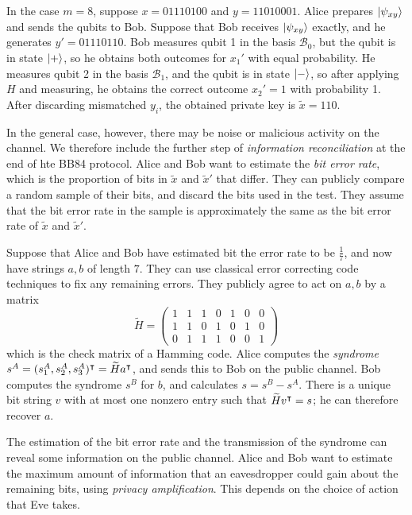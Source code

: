 In the case \( m = 8 \), suppose \( x = 01110100 \) and \( y = 11010001 \).
Alice prepares \( \ket{\psi_{xy}} \) and sends the qubits to Bob.
Suppose that Bob receives \( \ket{\psi_{xy}} \) exactly, and he generates \( y' = 01110110 \).
Bob measures qubit 1 in the basis \( \mathcal B_0 \), but the qubit is in state \( \ket{+} \), so he obtains both outcomes for \( x_1' \) with equal probability.
He measures qubit 2 in the basis \( \mathcal B_1 \), and the qubit is in state \( \ket{-} \), so after applying \( H \) and measuring, he obtains the correct outcome \( x_2' = 1 \) with probability 1.
After discarding mismatched \( y_i \), the obtained private key is \( \widetilde x = 110 \).

In the general case, however, there may be noise or malicious activity on the channel.
We therefore include the further step of \emph{information reconciliation} at the end of hte BB84 protocol.
Alice and Bob want to estimate the \emph{bit error rate}, which is the proportion of bits in \( \widetilde x \) and \( \widetilde x' \) that differ.
They can publicly compare a random sample of their bits, and discard the bits used in the test.
They assume that the bit error rate in the sample is approximately the same as the bit error rate of \( \widetilde x \) and \( \widetilde x' \).

Suppose that Alice and Bob have estimated bit the error rate to be \( \frac{1}{7} \), and now have strings \( a, b \) of length \( 7 \).
They can use classical error correcting code techniques to fix any remaining errors.
They publicly agree to act on \( a, b \) by a matrix
\[ \widetilde H = \begin{pmatrix}
    1 & 1 & 1 & 0 & 1 & 0 & 0 \\
    1 & 1 & 0 & 1 & 0 & 1 & 0 \\
    0 & 1 & 1 & 1 & 0 & 0 & 1
\end{pmatrix} \]
which is the check matrix of a Hamming code.
Alice computes the \emph{syndrome} \( s^A = (s_1^A, s_2^A, s_3^A)^\intercal = \widetilde H a^\intercal \), and sends this to Bob on the public channel.
Bob computes the syndrome \( s^B \) for \( b \), and calculates \( s = s^B - s^A \).
There is a unique bit string \( v \) with at most one nonzero entry such that \( \widetilde H v^\intercal = s \); he can therefore recover \( a \).

The estimation of the bit error rate and the transmission of the syndrome can reveal some information on the public channel.
Alice and Bob want to estimate the maximum amount of information that an eavesdropper could gain about the remaining bits, using \emph{privacy amplification}.
This depends on the choice of action that Eve takes.

